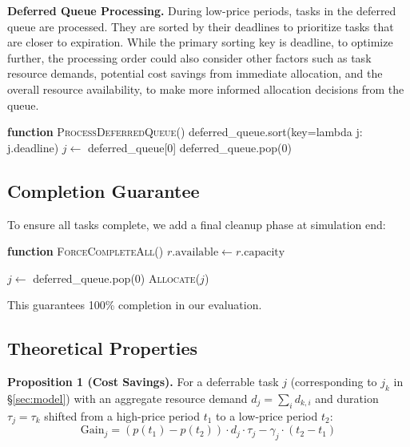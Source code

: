 \documentclass[10pt,conference]{IEEEtran}
\begin{document}
\textbf{Deferred Queue Processing.} During low-price periods, tasks in the deferred queue are processed. They are sorted by their deadlines to prioritize tasks that are closer to expiration. While the primary sorting key is deadline, to optimize further, the processing order could also consider other factors such as task resource demands, potential cost savings from immediate allocation, and the overall resource availability, to make more informed allocation decisions from the queue.

\begin{algorithmic}[1]
\State \textbf{function} \textsc{ProcessDeferredQueue}()
\State deferred\_queue.sort(key=lambda j: j.deadline)
    \State $j \gets$ deferred\_queue[0]
        \State deferred\_queue.pop(0)
    \EndIf
\EndWhile
\end{algorithmic}
\subsection{Completion Guarantee}

To ensure all tasks complete, we add a final cleanup phase at simulation end:
\begin{algorithmic}[1]
\State \textbf{function} \textsc{ForceCompleteAll}()
\State {}
    \State $r.\text{available} \gets r.\text{capacity}$
\EndFor

\State {}
    \State $j \gets$ deferred\_queue.pop(0)
    \State \textsc{Allocate}($j$)
\EndWhile
\end{algorithmic}

This guarantees 100\% completion in our evaluation.

\subsection{Theoretical Properties}

\textbf{Proposition 1 (Cost Savings).} For a deferrable task $j$ (corresponding to $j_k$ in \S\ref{sec:model}) with an aggregate resource demand $d_j = \sum_i d_{k,i}$ and duration $\tau_j = \tau_k$ shifted from a high-price period $t_1$ to a low-price period $t_2$: 
\begin{equation}
\text{Gain}_j = (p(t_1) - p(t_2)) \cdot d_j \cdot \tau_j - \gamma_j \cdot (t_2 - t_1)
\end{equation}
\end{document}
